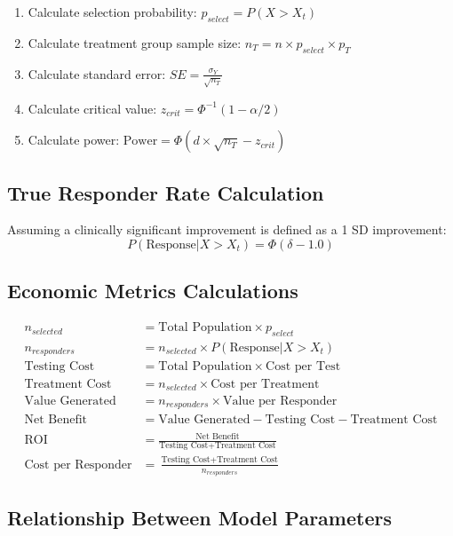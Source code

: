 \documentclass{article}
\begin{document}
\begin{enumerate}
    \item Calculate selection probability: $p_{select} = P(X > X_t)$
    \item Calculate treatment group sample size: $n_T = n \times p_{select} \times p_T$
    \item Calculate standard error: $SE = \frac{\sigma_Y}{\sqrt{n_T}}$
    \item Calculate critical value: $z_{crit} = \Phi^{-1}(1-\alpha/2)$
    \item Calculate power: $\text{Power} = \Phi\left(d \times \sqrt{n_T} - z_{crit}\right)$
\end{enumerate}

\subsection{True Responder Rate Calculation}

Assuming a clinically significant improvement is defined as a 1 SD improvement:
\begin{equation}
P(\text{Response}|X > X_t) = \Phi(\delta - 1.0)
\end{equation}

\subsection{Economic Metrics Calculations}

\begin{align}
n_{selected} &= \text{Total Population} \times p_{select} \\
n_{responders} &= n_{selected} \times P(\text{Response}|X > X_t) \\
\text{Testing Cost} &= \text{Total Population} \times \text{Cost per Test} \\
\text{Treatment Cost} &= n_{selected} \times \text{Cost per Treatment} \\
\text{Value Generated} &= n_{responders} \times \text{Value per Responder} \\
\text{Net Benefit} &= \text{Value Generated} - \text{Testing Cost} - \text{Treatment Cost} \\
\text{ROI} &= \frac{\text{Net Benefit}}{\text{Testing Cost} + \text{Treatment Cost}} \\
\text{Cost per Responder} &= \frac{\text{Testing Cost} + \text{Treatment Cost}}{n_{responders}}
\end{align}

\subsection{Relationship Between Model Parameters}
\end{document}
